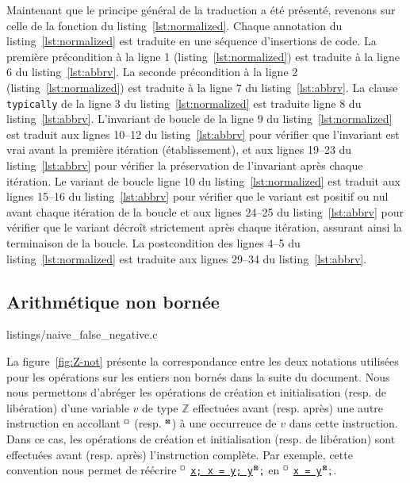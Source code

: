 Maintenant que le principe général de la traduction a été présenté, revenons
sur celle de la fonction du listing~\ref{lst:normalized}.
Chaque annotation du listing~\ref{lst:normalized} est traduite en une séquence
d'insertions de code.
La première précondition à la ligne 1 (listing~\ref{lst:normalized}) est
traduite à la ligne 6 du listing~\ref{lst:abbrv}.
La seconde précondition à la ligne 2 (listing~\ref{lst:normalized}) est
traduite à la ligne 7 du listing~\ref{lst:abbrv}.
La clause \lstinline'typically' de la ligne 3 du listing~\ref{lst:normalized}
est traduite ligne 8 du listing~\ref{lst:abbrv}.
L'invariant de boucle de la ligne 9 du listing~\ref{lst:normalized} est traduit
aux lignes 10--12 du listing~\ref{lst:abbrv} pour vérifier que l'invariant est
vrai avant la première itération (établissement), et aux lignes 19--23 du
listing~\ref{lst:abbrv} pour vérifier la préservation de l'invariant après
chaque itération.
Le variant de boucle ligne 10 du listing~\ref{lst:normalized} est traduit aux
lignes 15--16 du listing~\ref{lst:abbrv} pour vérifier que le variant est
positif ou nul avant chaque itération de la boucle et aux lignes 24--25 du
listing~\ref{lst:abbrv} pour vérifier que le
variant décroît strictement après chaque itération, assurant ainsi la
terminaison de la boucle.
La postcondition des lignes 4--5 du listing~\ref{lst:normalized} est traduite
aux lignes 29--34 du listing~\ref{lst:abbrv}.


\subsection{Arithmétique non bornée}
\label{sec:integers}



                {listings/naive_false_negative.c}


La figure~\ref{fig:Z-not} présente la correspondance entre les deux notations
utilisées pour les opérations sur les entiers non bornés dans la suite du
document.
Nous nous permettons d'abréger les opérations de création et initialisation
(resp. de libération) d'une variable $v$ de type $\mathbb{Z}$ effectuées
avant (resp. après) une autre instruction en accollant ${^\square}$ (resp.
${^\boxtimes}$) à une occurrence de $v$ dans cette instruction.
Dans ce cas, les opérations de création et initialisation (resp. de libération)
sont effectuées avant (resp. après) l'instruction complète.
Par exemple, cette convention nous permet de réécrire
${^\square}$ \underline{\lstinline'x; x = y; y'}$\Zclear\semicolon$ en
${^\square}$ \underline{\lstinline'x = y'}$\Zclear\semicolon$. 

